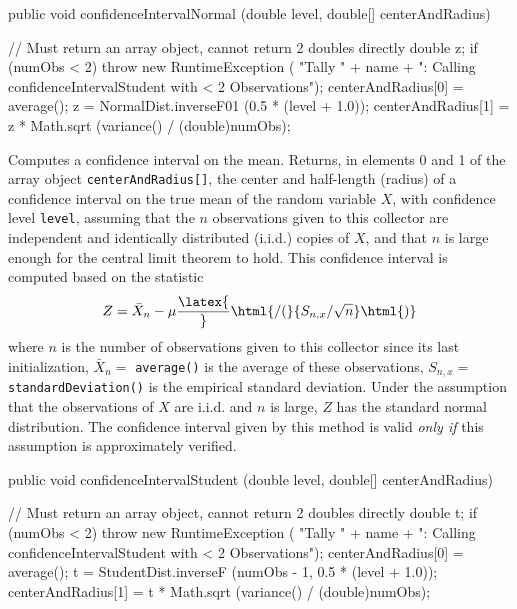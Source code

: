 \begin{htmlonly}
\end{htmlonly}
\begin{code}

   public void confidenceIntervalNormal (double level,
                                         double[] centerAndRadius) \begin{hide} {
      // Must return an array object, cannot return 2 doubles directly
      double z;
      if (numObs < 2) throw new RuntimeException (
          "Tally " + name +
          ": Calling confidenceIntervalStudent with < 2 Observations");
      centerAndRadius[0] =  average();
      z = NormalDist.inverseF01 (0.5 * (level + 1.0));
      centerAndRadius[1] = z * Math.sqrt (variance() / (double)numObs);
   }\end{hide}
\end{code}
  \begin{tabb} Computes a confidence interval on the mean.
  Returns, in elements 0 and 1 of the array
  object \texttt{centerAndRadius[]}, the center and half-length (radius)
  of a confidence interval on the true mean of the random variable $X$,
  with confidence level \texttt{level}, assuming that the $n$ observations
  given to this collector are independent and identically distributed
  (i.i.d.) copies of $X$, and that $n$ is large enough for the central limit
  theorem to hold.  This confidence interval is computed based on the statistic
  $$
    Z = {\bar X_n - \mu\latex{\over}\html{ / (}{S_{n,x}/\sqrt{n}}\html{)}}
  $$
  where $n$ is the number of observations given to this collector since its
  last initialization, $\bar X_n =$ \texttt{average()} is the average of these
  observations, $S_{n,x} =$ \texttt{standardDeviation()} is the empirical
  standard  deviation.  Under the assumption that the observations
  of $X$ are  i.i.d.{} and $n$ is large,
  $Z$ has the standard normal distribution.
  The confidence interval given by this method is valid \emph{only if}
  this assumption is approximately verified.
 \end{tabb}
\begin{htmlonly}
\end{htmlonly}
\begin{code}

   public void confidenceIntervalStudent (double level,
                                          double[] centerAndRadius) \begin{hide} {
      // Must return an array object, cannot return 2 doubles directly
      double t;
      if (numObs < 2) throw new RuntimeException (
          "Tally " + name +
          ": Calling confidenceIntervalStudent with < 2 Observations");
      centerAndRadius[0] =  average();
      t = StudentDist.inverseF (numObs - 1, 0.5 * (level + 1.0));
      centerAndRadius[1] = t * Math.sqrt (variance() / (double)numObs);
   }\end{hide}
\end{code}
